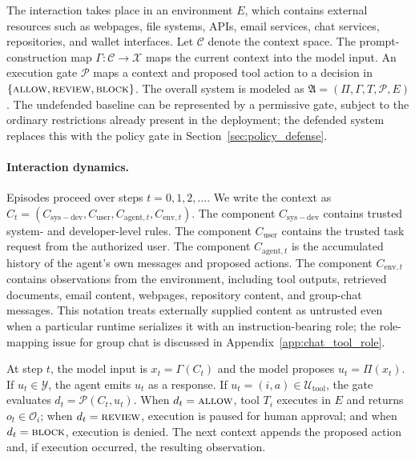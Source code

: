 \documentclass{article}
\begin{document}
The interaction takes place in an environment $E$, which contains external resources such as webpages, file systems, APIs, email services, chat services, repositories, and wallet interfaces. Let $\mathcal{C}$ denote the context space. The prompt-construction map $\Gamma:\mathcal{C}\to\mathcal{X}$ maps the current context into the model input. An execution gate $\mathcal{P}$ maps a context and proposed tool action to a decision in $\{\textsc{allow},\textsc{review},\textsc{block}\}$. The overall system is modeled as $\mathfrak{A}=(\Pi,\Gamma,T,\mathcal{P},E)$. The undefended baseline can be represented by a permissive gate, subject to the ordinary restrictions already present in the deployment; the defended system replaces this with the policy gate in Section~\ref{sec:policy_defense}.

\paragraph{Interaction dynamics.}
Episodes proceed over steps $t=0,1,2,\ldots$. We write the context as $C_t=(C_{\mathrm{sys-dev}},C_{\mathrm{user}},C_{\mathrm{agent},t},C_{\mathrm{env},t})$. The component $C_{\mathrm{sys-dev}}$ contains trusted system- and developer-level rules. The component $C_{\mathrm{user}}$ contains the trusted task request from the authorized user. The component $C_{\mathrm{agent},t}$ is the accumulated history of the agent's own messages and proposed actions. The component $C_{\mathrm{env},t}$ contains observations from the environment, including tool outputs, retrieved documents, email content, webpages, repository content, and group-chat messages. This notation treats externally supplied content as untrusted even when a particular runtime serializes it with an instruction-bearing role; the role-mapping issue for group chat is discussed in Appendix~\ref{app:chat_tool_role}.

At step $t$, the model input is $x_t=\Gamma(C_t)$ and the model proposes $u_t=\Pi(x_t)$. If $u_t\in\mathcal{Y}$, the agent emits $u_t$ as a response. If $u_t=(i,a)\in\mathcal{U}_{\mathrm{tool}}$, the gate evaluates $d_t=\mathcal{P}(C_t,u_t)$. When $d_t=\textsc{allow}$, tool $T_i$ executes in $E$ and returns $o_t\in\mathcal{O}_i$; when $d_t=\textsc{review}$, execution is paused for human approval; and when $d_t=\textsc{block}$, execution is denied. The next context appends the proposed action and, if execution occurred, the resulting observation.
\end{document}
